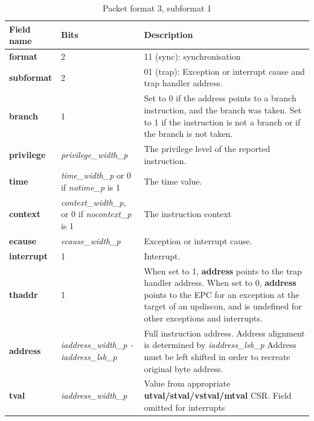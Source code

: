 \begin{table}[htp]
  \centering
  \caption{Packet format 3, subformat 1}
  \label{tab:te_inst3-1}
  \begin{tabulary}{\textwidth}{|l|p{35mm}|p{90mm}|}
    \hline
    {\bf Field name} & {\bf Bits} & {\bf Description} \\
    \hline
    \textbf{format} & 2 & 11 (sync): synchronisation\\
    \hline
    \textbf{subformat} & 2 & 01 (trap): Exception or interrupt cause and trap handler address.\\
    \hline
    \textbf{branch} & 1 & Set to 0 if the address points to a branch instruction, and the branch was taken.  
              Set to 1 if the instruction is not a branch or if the branch is not taken. \\
    \hline
    \textbf{privilege} & \textit {privilege\_width\_p} & 
                The privilege level of the reported instruction.\\
    \hline
    \textbf{time} &  \textit {time\_width\_p} or 0 if \textit {notime\_p} is 1 & 
               The time value. \\
    \hline
    \textbf{context} &  \textit {context\_width\_p}, or 0 if \textit {nocontext\_p} is 1 & The instruction context  \\
    \hline
    \textbf{ecause} & \textit {ecause\_width\_p} & Exception or interrupt cause. \\
    \hline
    \textbf{interrupt} & 1 & Interrupt. \\
    \hline
    \textbf{thaddr} & 1 &
               When set to 1, \textbf{address} points to the trap handler address.  
                When set to 0, \textbf{address} points to the EPC for an exception at the target of an updiscon, 
                and is undefined for other exceptions and interrupts.\\
    \hline
    \textbf{address} & \textit {iaddress\_width\_p - iaddress\_lsb\_p} & 
              Full instruction address.  Address alignment is determined by \textit {iaddress\_lsb\_p} 
              Address must be left shifted in order to recreate original byte address. \\
    \hline
    \textbf{tval} & \textit {iaddress\_width\_p} & 
           Value from appropriate \textbf{utval/stval/vstval/mtval} CSR.  
           Field omitted for interrupts\\
    \hline
  \end{tabulary}
\end{table}

